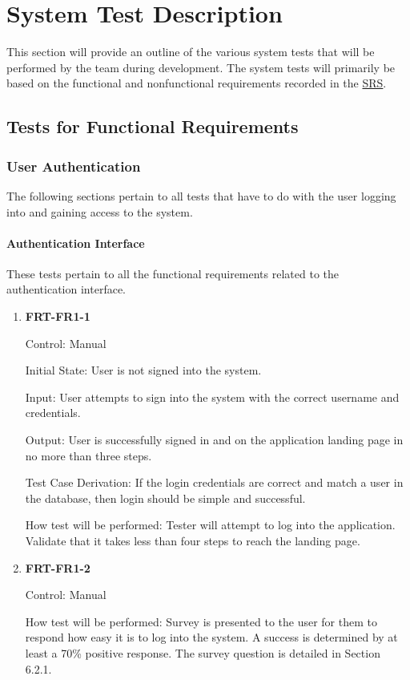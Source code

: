 \documentclass[12pt, titlepage]{article}
\begin{document}
\section{System Test Description}

This section will provide an outline of the various system tests that will be performed
by the team during development. The system tests will primarily be based on the functional and nonfunctional requirements
recorded in the \href{https://github.com/r-yeh/grocery-spending-tracker/blob/master/docs/SRS/SRS.pdf}{SRS}.
	
\subsection{Tests for Functional Requirements}

\subsubsection{User Authentication}

The following sections pertain to all tests that have to do with the user logging into and gaining access to the system.

\paragraph{Authentication Interface}

These tests pertain to all the functional requirements related to the authentication interface.

\begin{enumerate}

\item{\textbf{FRT-FR1-1}}

Control: Manual
          
Initial State: User is not signed into the system.
          
Input: User attempts to sign into the system with the correct username and credentials.

Output: User is successfully signed in and on the application landing page in no more than three steps.

Test Case Derivation: If the login credentials are correct and match a user in the database, then login should be simple and successful.
          
How test will be performed: Tester will attempt to log into the application. Validate that it takes less than four steps to reach the landing page.

\item{\textbf{FRT-FR1-2}}

Control: Manual
          
How test will be performed: Survey is presented to the user for them to respond how easy it is to log into the system.
A success is determined by at least a 70\% positive response. The survey question is detailed in Section 6.2.1.

\end{enumerate}
\end{document}
